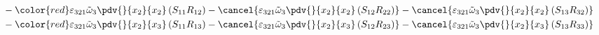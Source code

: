 \begin{equation}
\begin{split}
&		-{\color{red}\varepsilon_{321}\tilde{\omega}_{3}\pdv{}{x_{2}}{x_{2}}\left(S_{11}R_{12}\right)}
		-\cancel{\varepsilon_{321}\tilde{\omega}_{3}\pdv{}{x_{2}}{x_{2}}\left(S_{12}R_{22}\right)}
		-\cancel{\varepsilon_{321}\tilde{\omega}_{3}\pdv{}{x_{2}}{x_{2}}\left(S_{13}R_{32}\right)}\\
&		-{\color{red}\varepsilon_{321}\tilde{\omega}_{3}\pdv{}{x_{2}}{x_{3}}\left(S_{11}R_{13}\right)}
		-\cancel{\varepsilon_{321}\tilde{\omega}_{3}\pdv{}{x_{2}}{x_{3}}\left(S_{12}R_{23}\right)}
		-\cancel{\varepsilon_{321}\tilde{\omega}_{3}\pdv{}{x_{2}}{x_{3}}\left(S_{13}R_{33}\right)}\\
	\end{split}
\end{equation}
